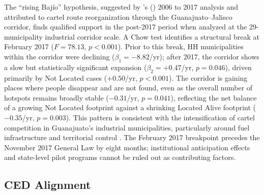 The ``rising Baj\'{i}o'' hypothesis, suggested by \citeauthor{cadena_garrocho_2019}'s (\citeyear{cadena_garrocho_2019}) 2006 to 2017 analysis and attributed to cartel route reorganization through the Guanajuato--Jalisco corridor, finds qualified support in the post-2017 period when analyzed at the 29-municipality industrial corridor scale.
A Chow test identifies a structural break at February 2017 ($F = 78.13$, $p < 0.001$).
Prior to this break, HH municipalities within the corridor were declining ($\beta_1 = -8.82$/yr); after 2017, the corridor shows a slow but statistically significant expansion ($\beta_2 = +0.47$/yr, $p = 0.046$), driven primarily by Not Located cases ($+0.50$/yr, $p < 0.001$).
The corridor is gaining places where people disappear and are not found, even as the overall number of hotspots remains broadly stable ($-0.31$/yr, $p = 0.041$), reflecting the net balance of a growing Not Located footprint against a shrinking Located Alive footprint ($-0.35$/yr, $p = 0.003$).
This pattern is consistent with the intensification of cartel competition in Guanajuato's industrial municipalities, particularly around fuel infrastructure and territorial control \citep{le_cour_2020}.
The February 2017 breakpoint precedes the November 2017 General Law by eight months; institutional anticipation effects and state-level pilot programs cannot be ruled out as contributing factors.

\subsection{CED Alignment}
\label{sec:disc_ced}

